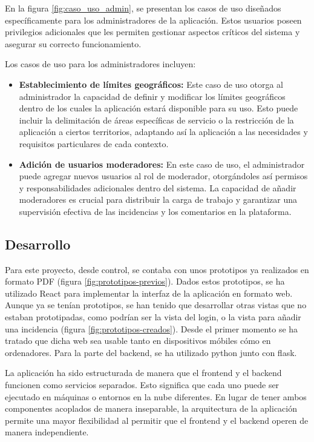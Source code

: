 \documentclass{article}
\begin{document}
En la figura \ref{fig:caso_uso_admin}, se presentan los casos de uso diseñados específicamente para los administradores de la aplicación. Estos usuarios poseen privilegios adicionales que les permiten gestionar aspectos críticos del sistema y asegurar su correcto funcionamiento.

Los casos de uso para los administradores incluyen:
\begin{itemize}
    \item \textbf{Establecimiento de límites geográficos:} Este caso de uso otorga al administrador la capacidad de definir y modificar los límites geográficos dentro de los cuales la aplicación estará disponible para su uso. Esto puede incluir la delimitación de áreas específicas de servicio o la restricción de la aplicación a ciertos territorios, adaptando así la aplicación a las necesidades y requisitos particulares de cada contexto.
    \item \textbf{Adición de usuarios moderadores:} En este caso de uso, el administrador puede agregar nuevos usuarios al rol de moderador, otorgándoles así permisos y responsabilidades adicionales dentro del sistema. La capacidad de añadir moderadores es crucial para distribuir la carga de trabajo y garantizar una supervisión efectiva de las incidencias y los comentarios en la plataforma.
\end{itemize}

\subsection{Desarrollo}

Para este proyecto, desde control, se contaba con unos prototipos ya realizados en formato PDF (figura \ref{fig:prototipos-previos}). Dados estos prototipos, se ha utilizado React para implementar la interfaz de la aplicación en formato web. Aunque ya se tenían prototipos, se han tenido que desarrollar otras vistas que no estaban prototipadas, como podrían ser la vista del login, o la vista para añadir una incidencia (figura \ref{fig:prototipos-creados}). Desde el primer momento se ha tratado que dicha web sea usable tanto en dispositivos móbiles cómo en ordenadores. Para la parte del backend, se ha utilizado python junto con flask. 

La aplicación ha sido estructurada de manera que el frontend y el backend funcionen como servicios separados. Esto significa que cada uno puede ser ejecutado en máquinas o entornos en la nube diferentes. En lugar de tener ambos componentes acoplados de manera inseparable, la arquitectura de la aplicación permite una mayor flexibilidad al permitir que el frontend y el backend operen de manera independiente.
\end{document}

